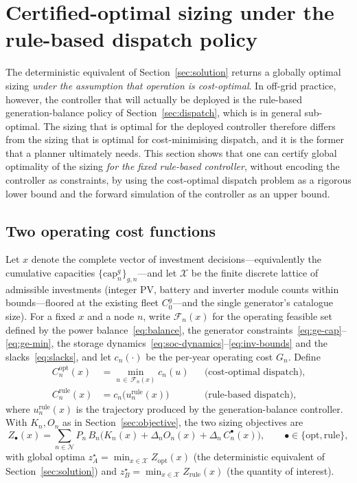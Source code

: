 \documentclass[11pt,a4paper]{article}
\theoremstyle{plain}
\theoremstyle{definition}
\begin{document}
\section{Certified-optimal sizing under the rule-based dispatch policy}
\label{sec:certify}

The deterministic equivalent of Section~\ref{sec:solution} returns a globally optimal
sizing \emph{under the assumption that operation is cost-optimal}. In off-grid practice,
however, the controller that will actually be deployed is the rule-based
generation-balance policy of Section~\ref{sec:dispatch}, which is in general
sub-optimal. The sizing that is optimal for the deployed controller therefore differs
from the sizing that is optimal for cost-minimising dispatch, and it is the former that a
planner ultimately needs. This section shows that one can certify global optimality of
the sizing \emph{for the fixed rule-based controller}, without encoding the controller as
constraints, by using the cost-optimal dispatch problem as a rigorous lower bound and the
forward simulation of the controller as an upper bound.

\subsection{Two operating cost functions}

Let $x$ denote the complete vector of investment decisions---equivalently the cumulative
capacities $\{\mathrm{cap}^{g}_n\}_{g,n}$---and let $\mathcal{X}$ be the finite discrete
lattice of admissible investments (integer PV, battery and inverter module counts within
bounds---floored at the existing fleet $C^{g}_0$---and the single generator's catalogue
size). For a fixed $x$ and a node $n$, write
$\mathcal{F}_n(x)$ for the operating feasible set defined by the power
balance~\eqref{eq:balance}, the generator
constraints~\eqref{eq:ge-cap}--\eqref{eq:ge-min}, the storage
dynamics~\eqref{eq:soc-dynamics}--\eqref{eq:inv-bounds} and the
slacks~\eqref{eq:slacks}, and let $c_n(\cdot)$ be the per-year operating cost $G_n$. Define
\begin{align}
  C^{\mathrm{opt}}_n(x) &= \min_{u\,\in\,\mathcal{F}_n(x)} c_n(u)
      && \text{(cost-optimal dispatch),}\\
  C^{\mathrm{rule}}_n(x) &= c_n\big(u^{\mathrm{rule}}_n(x)\big)
      && \text{(rule-based dispatch),}
\end{align}
where $u^{\mathrm{rule}}_n(x)$ is the trajectory produced by the generation-balance
controller. With $K_n,O_n$ as in Section~\ref{sec:objective}, the two sizing objectives are
\begin{equation}
  Z_\bullet(x) = \sum_{n\in\mathcal{N}} P_n\,B_n
  \big( K_n(x) + \Delta_n O_n(x) + \Delta_n\,C^{\bullet}_n(x) \big),
  \qquad \bullet\in\{\mathrm{opt},\mathrm{rule}\},
\end{equation}
with global optima $z_A^\star=\min_{x\in\mathcal{X}} Z_{\mathrm{opt}}(x)$ (the
deterministic equivalent of Section~\ref{sec:solution}) and
$z_B^\star=\min_{x\in\mathcal{X}} Z_{\mathrm{rule}}(x)$ (the quantity of interest).
\end{document}
